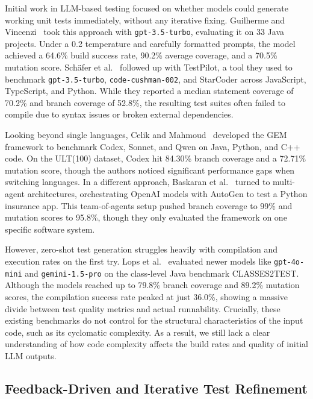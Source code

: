 \documentclass[conference]{IEEEtran}
\begin{document}
Initial work in LLM-based testing focused on whether models could generate working unit tests immediately, without any iterative fixing. Guilherme and Vincenzi~\cite{guilherme2023sast} took this approach with \texttt{gpt-3.5-turbo}, evaluating it on 33 Java projects. Under a 0.2 temperature and carefully formatted prompts, the model achieved a 64.6\% build success rate, 90.2\% average coverage, and a 70.5\% mutation score. Sch{\"a}fer et al.~\cite{schafer2024testpilot} followed up with TestPilot, a tool they used to benchmark \texttt{gpt-3.5-turbo}, \texttt{code-cushman-002}, and StarCoder across JavaScript, TypeScript, and Python. While they reported a median statement coverage of 70.2\% and branch coverage of 52.8\%, the resulting test suites often failed to compile due to syntax issues or broken external dependencies.

Looking beyond single languages, Celik and Mahmoud~\cite{celik2026gem} developed the GEM framework to benchmark Codex, Sonnet, and Qwen on Java, Python, and C++ code. On the ULT(100) dataset, Codex hit 84.30\% branch coverage and a 72.71\% mutation score, though the authors noticed significant performance gaps when switching languages. In a different approach, Baskaran et al.~\cite{baskaran2025jucct} turned to multi-agent architectures, orchestrating OpenAI models with AutoGen to test a Python insurance app. This team-of-agents setup pushed branch coverage to 99\% and mutation scores to 95.8\%, though they only evaluated the framework on one specific software system.

However, zero-shot test generation struggles heavily with compilation and execution rates on the first try. Lops et al.~\cite{lops2025agonetest} evaluated newer models like \texttt{gpt-4o-mini} and \texttt{gemini-1.5-pro} on the class-level Java benchmark CLASSES2TEST. Although the models reached up to 79.8\% branch coverage and 89.2\% mutation scores, the compilation success rate peaked at just 36.0\%, showing a massive divide between test quality metrics and actual runnability. Crucially, these existing benchmarks do not control for the structural characteristics of the input code, such as its cyclomatic complexity. As a result, we still lack a clear understanding of how code complexity affects the build rates and quality of initial LLM outputs.

\subsection{Feedback-Driven and Iterative Test Refinement}
\label{subsec:iterative_refinement}
\end{document}

